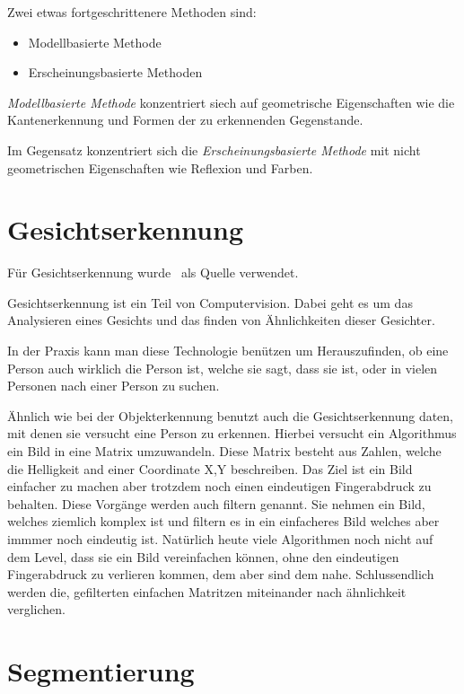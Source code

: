 Zwei etwas fortgeschrittenere Methoden sind:

\begin{itemize}
    \item Modellbasierte Methode
    \item Erscheinungsbasierte Methoden
\end{itemize}

\emph{Modellbasierte Methode} konzentriert siech auf geometrische Eigenschaften wie die Kantenerkennung und Formen der zu erkennenden Gegenstande.

Im Gegensatz konzentriert sich die \emph{Erscheinungsbasierte Methode} mit nicht geometrischen Eigenschaften wie Reflexion und Farben.

\section{Gesichtserkennung}
\label{sec:gesichtserkennung}

Für Gesichtserkennung wurde~\cite{Lewis_2021} als Quelle verwendet.

Gesichtserkennung ist ein Teil von Computervision.
Dabei geht es um das Analysieren eines Gesichts und das finden von Ähnlichkeiten dieser Gesichter.

In der Praxis kann man diese Technologie benützen um Herauszufinden, ob eine Person auch wirklich die Person ist, welche sie sagt, dass sie ist, oder in vielen Personen nach einer Person zu suchen.

Ähnlich wie bei der Objekterkennung benutzt auch die Gesichtserkennung daten, mit denen sie versucht eine Person zu erkennen.
Hierbei versucht ein Algorithmus ein Bild in eine Matrix umzuwandeln.
Diese Matrix besteht aus Zahlen, welche die Helligkeit and einer Coordinate X,Y beschreiben.
Das Ziel ist ein Bild einfacher zu machen aber trotzdem noch einen eindeutigen Fingerabdruck zu behalten.
Diese Vorgänge werden auch filtern genannt.
Sie nehmen ein Bild, welches ziemlich komplex ist und filtern es in ein einfacheres Bild welches aber immmer noch eindeutig ist.
Natürlich heute viele Algorithmen noch nicht auf dem Level, dass sie ein Bild vereinfachen können, ohne den eindeutigen Fingerabdruck zu verlieren kommen, dem aber sind dem nahe.
Schlussendlich werden die, gefilterten einfachen Matritzen miteinander nach ähnlichkeit verglichen.

\section{Segmentierung}
\label{sec:segmentierung}

